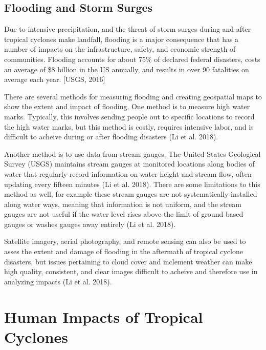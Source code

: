 \documentclass[
]{article}
\begin{document}
\hypertarget{flooding-and-storm-surges}{%
\subsection{Flooding and Storm Surges}\label{flooding-and-storm-surges}}

Due to intensive precipitation, and the threat of storm surges during
and after tropical cyclones make landfall, flooding is a major
consequence that has a number of impacts on the infrastructure, safety,
and economic strength of communities. Flooding accounts for about 75\%
of declared federal disasters, costs an average of \$8 billion in the US
annually, and results in over 90 fatalities on average each year.
{[}USGS, 2016{]}

There are several methods for measuring flooding and creating geospatial
maps to show the extent and impact of flooding. One method is to measure
high water marks. Typically, this involves sending people out to
specific locations to record the high water marks, but this method is
costly, requires intensive labor, and is difficult to acheive during or
after flooding disasters (Li et al. 2018).

Another method is to use data from stream gauges. The United States
Geological Survey (USGS) maintains stream gauges at monitored locations
along bodies of water that regularly record information on water height
and stream flow, often updating every fifteen minutes (Li et al. 2018).
There are some limitations to this method as well, for example these
stream gauges are not systematically installed along water ways, meaning
that information is not uniform, and the stream gauges are not useful if
the water level rises above the limit of ground based gauges or washes
gauges away entirely (Li et al. 2018).

Satellite imagery, aerial photography, and remote sensing can also be
used to asses the extent and damage of flooding in the aftermath of
tropical cyclone disasters, but issues pertaining to cloud cover and
inclement weather can make high quality, consistent, and clear images
difficult to acheive and therefore use in analyzing impacts (Li et al.
2018).

\hypertarget{human-impacts-of-tropical-cyclones}{%
\section{Human Impacts of Tropical
Cyclones}\label{human-impacts-of-tropical-cyclones}}
\end{document}
